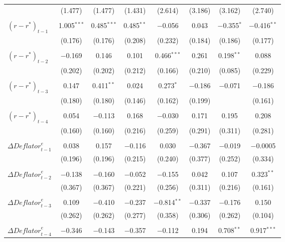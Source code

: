 \documentclass[11pt]{article}
\begin{document}
\begin{table}[!htbp]
\begin{threeparttable}
\begin{tabular}{@{\extracolsep{5pt}}lccccccc}
    & (1.477) & (1.477) & (1.431) & (2.614) & (3.186) & (3.162) & (2.740) \\ 
    & & & & & & & \\ 
    $\left(r-r^*\right)_{t-1}$ & 1.005$^{***}$ & 0.485$^{***}$ & 0.485$^{**}$ & $-$0.056 & 0.043 & $-$0.355$^{*}$ & $-$0.416$^{**}$ \\ 
    & (0.176) & (0.176) & (0.208) & (0.232) & (0.184) & (0.186) & (0.177) \\ 
    & & & & & & & \\ 
    $\left(r-r^*\right)_{t-2}$ & $-$0.169 & 0.146 & 0.101 & 0.466$^{***}$ & 0.261 & 0.198$^{**}$ & 0.088 \\ 
    & (0.202) & (0.202) & (0.212) & (0.166) & (0.210) & (0.085) & (0.229) \\ 
    & & & & & & & \\ 
    $\left(r-r^*\right)_{t-3}$ & 0.147 & 0.411$^{**}$ & 0.024 & 0.273$^{*}$ & $-$0.186 & $-$0.071 & $-$0.186 \\ 
    & (0.180) & (0.180) & (0.146) & (0.162) & (0.199) &  & (0.161) \\ 
    & & & & & & & \\ 
    $\left(r-r^*\right)_{t-4}$ & 0.054 & $-$0.113 & 0.168 & $-$0.030 & 0.171 & 0.195 & 0.208 \\ 
    & (0.160) & (0.160) & (0.216) & (0.259) & (0.291) & (0.311) & (0.281) \\ 
    & & & & & & & \\ 
    $\Delta\mathit{Deflator}_{t-1}^e$ & 0.038 & 0.157 & $-$0.116 & 0.030 & $-$0.367 & $-$0.019 & $-$0.0005 \\ 
    & (0.196) & (0.196) & (0.215) & (0.240) & (0.377) & (0.252) & (0.334) \\ 
    & & & & & & & \\ 
    $\Delta\mathit{Deflator}_{t-2}^e$ & $-$0.138 & $-$0.160 & $-$0.052 & $-$0.155 & 0.042 & 0.107 & 0.323$^{**}$ \\ 
    & (0.367) & (0.367) & (0.221) & (0.256) & (0.311) & (0.216) & (0.161) \\ 
    & & & & & & & \\ 
    $\Delta\mathit{Deflator}_{t-3}^e$ & 0.109 & $-$0.410 & $-$0.237 & $-$0.814$^{**}$ & $-$0.337 & $-$0.176 & 0.150 \\ 
    & (0.262) & (0.262) & (0.277) & (0.358) & (0.306) & (0.262) & (0.104) \\ 
    & & & & & & & \\ 
    $\Delta\mathit{Deflator}_{t-4}^e$ & $-$0.346 & $-$0.143 & $-$0.357 & $-$0.112 & 0.194 & 0.708$^{**}$ & 0.917$^{***}$ \\ 

\end{tabular}
\end{threeparttable}
\end{table}
\end{document}
